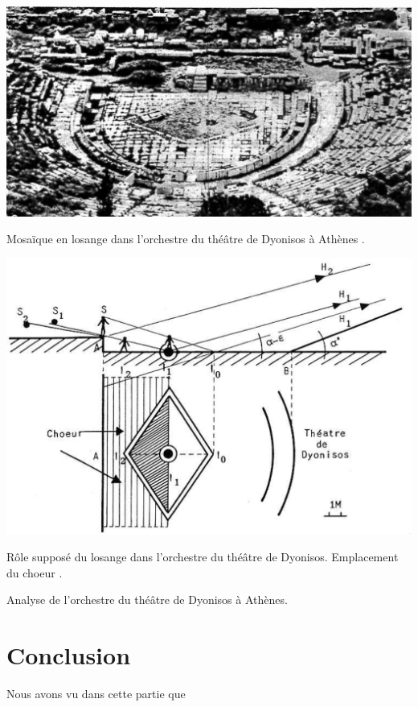 \begin{figureth}
	\begin{subfigureth}{0.48\textwidth}
		\includegraphics[width=\linewidth]{images/dyonisos1}
		\caption[Mosaïque en losange dans l'orchestre du théâtre de Dyonisos à Athènes.]{Mosaïque en losange dans l'orchestre du théâtre de Dyonisos à Athènes \footnotemark.}
		\label{dyonisos1}
		\hfill
		\quad
	\end{subfigureth}
	\quad
	\begin{subfigureth}{0.48\textwidth}
		\includegraphics[width=\linewidth]{images/dyonisos2}
		\caption[Rôle supposé du losange dans l'orchestre du théâtre de Dyonisos. Emplacement du choeur.]{Rôle supposé du losange dans l'orchestre du théâtre de Dyonisos. Emplacement du choeur \footnotemark.}
		\label{dyonisos2}
		\quad
	\end{subfigureth} 
\caption{Analyse de l'orchestre du théâtre de Dyonisos à Athènes.}	
\label{dyonisos}
\end{figureth}	
\addtocounter{footnote}{-1}
\addtocounter{footnote}{1}

\chapter*{Conclusion}
Nous avons vu dans cette partie que 
\newpage

 
 
